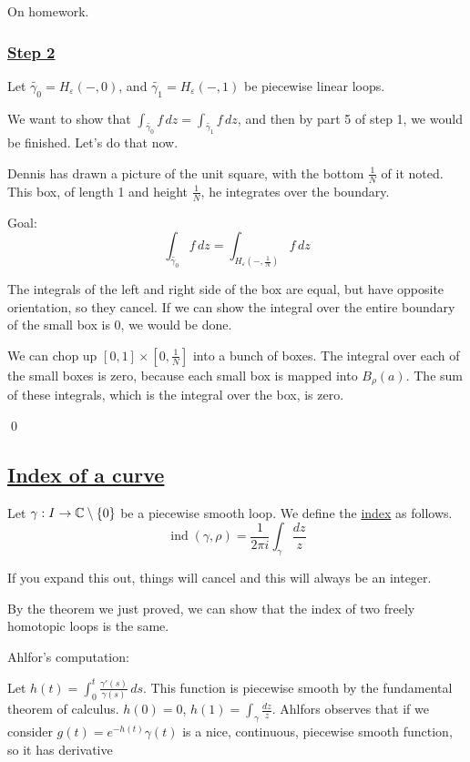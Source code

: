 \documentclass[x11names,reqno,14pt]{extarticle}
\begin{document}
\proof

On homework.

\subsubsection*{\underline{Step 2}}

Let $\tilde{\gamma_0} = H_\varepsilon(-, 0)$, and $\tilde{\gamma_1} = H_\varepsilon(-, 1)$ be piecewise linear loops. 

We want to show that $\int_{\tilde{\gamma_0}}f\,dz = \int_{\tilde{\gamma_1}}f\,dz$, and then by part 5 of step 1, we would be finished. Let's do that now. 

Dennis has drawn a picture of the unit square, with the bottom $\frac{1}{N}$ of it noted. This box, of length 1 and height $\frac{1}{N}$, he integrates over the boundary.

Goal: 
\[
\int_{\tilde{\gamma_0}}f\,dz = \int_{H_\varepsilon(-, \frac{1}{N})}f\,dz
\]

The integrals of the left and right side of the box are equal, but have opposite orientation, so they cancel. If we can show the integral over the entire boundary of the small box is 0, we would be done. 

We can chop up $[0, 1]\times[0,\frac{1}{N}]$ into a bunch of boxes. The integral over each of the small boxes is zero, because each small box is mapped into $B_\rho(a)$. The sum of these integrals, which is the integral over the box, is zero. 

\qed

\subsection*{\underline{Index of a curve}}


Let $\gamma:I\to\mathbb{C}\setminus\{0\}$ be a piecewise smooth loop. We define the \underline{index} as follows.
\[
\operatorname{ind}(\gamma, \rho) = \frac{1}{2\pi i}\int_\gamma\frac{dz}{z}
\]

If you expand this out, things will cancel and this will always be an integer. 

By the theorem we just proved, we can show that the index of two freely homotopic loops is the same. 

Ahlfor's computation: 

Let $h(t) = \int_0^t\frac{\gamma'(s)}{\gamma(s)}\,ds$. This function is piecewise smooth by the fundamental theorem of calculus. $h(0) = 0$, $h(1) = \int_{\gamma}\frac{dz}{z}$. Ahlfors observes that if we consider $g(t) = e^{-h(t)}\gamma(t)$ is a nice, continuous, piecewise smooth function, so it has derivative 
\end{document}

